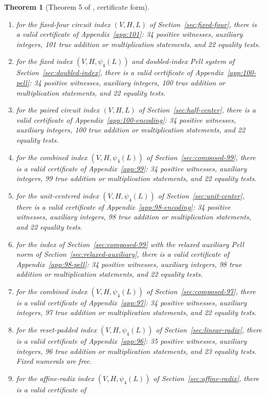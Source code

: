 \documentclass[11pt,letterpaper]{article}
\newtheorem{theorem}{Theorem}[section]
\theoremstyle{definition}
\theoremstyle{remark}
\numberwithin{equation}{section}
\begin{document}
\begin{theorem}[Theorem 5 of \cite{J80}, certificate form]
\begin{enumerate}[nosep,label=\textup{(\alph*)}]
\item for the fixed-four circuit index $(V,H,L)$ of
 Section~\ref{sec:fixed-four}, there is a valid certificate of
 Appendix~\ref{app:101}: 34 positive witnesses, auxiliary integers,
 101 true addition or multiplication statements, and 22 equality tests.
\item for the fixed index $(V,H,\psi_4(L))$ and doubled-index Pell
 system of Section~\ref{sec:doubled-index}, there is a valid certificate
 of Appendix~\ref{app:100-pell}: 34 positive witnesses, auxiliary
 integers, 100 true addition or multiplication statements, and 22 equality tests.
\item for the paired circuit index $(V,H,L)$ of
 Section~\ref{sec:half-center}, there is a valid certificate of
 Appendix~\ref{app:100-encoding}: 34 positive witnesses, auxiliary
 integers, 100 true addition or multiplication statements, and 22 equality tests.
\item for the combined index $(V,H,\psi_4(L))$ of
 Section~\ref{sec:composed-99}, there is a valid certificate of
 Appendix~\ref{app:99}: 34 positive witnesses, auxiliary integers,
 99 true addition or multiplication statements, and 22 equality tests.
\item for the unit-centered index $(V,H,\psi_4(L))$ of
 Section~\ref{sec:unit-center}, there is a valid certificate of
 Appendix~\ref{app:98-encoding}: 34 positive witnesses, auxiliary integers,
 98 true addition or multiplication statements, and 22 equality tests.
\item for the index of Section~\ref{sec:composed-99} with the relaxed
 auxiliary Pell norm of Section~\ref{sec:relaxed-auxiliary}, there is a
 valid certificate of Appendix~\ref{app:98-pell}: 34 positive witnesses,
 auxiliary integers, 98 true addition or multiplication statements,
 and 22 equality tests.
\item for the combined index $(V,H,\psi_4(L))$ of
 Section~\ref{sec:composed-97}, there is a valid certificate of
 Appendix~\ref{app:97}: 34 positive witnesses, auxiliary integers,
 97 true addition or multiplication statements, and 22 equality tests.
\item for the reset-padded index $(V,H,\psi_4(L))$ of
 Section~\ref{sec:linear-radix}, there is a valid certificate of
 Appendix~\ref{app:96}: 35 positive witnesses, auxiliary integers,
 96 true addition or multiplication statements, and 23 equality tests.
 Fixed numerals are free.
\item for the affine-radix index $(V,H,\psi_4(L))$ of
 Section~\ref{sec:affine-radix}, there is a valid certificate of

\end{enumerate}
\end{theorem}
\end{document}
